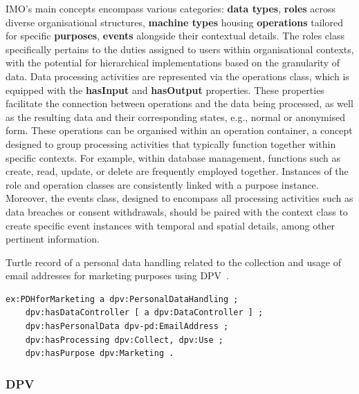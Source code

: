 IMO's main concepts encompass various categories: \textbf{data types}, \textbf{roles} across diverse organisational structures, \textbf{machine types} housing \textbf{operations} tailored for specific \textbf{purposes}, \textbf{events} alongside their contextual details.
The roles class specifically pertains to the duties assigned to users within organisational contexts, with the potential for hierarchical implementations based on the granularity of data.
Data processing activities are represented via the operations class, which is equipped with the \textbf{hasInput} and \textbf{hasOutput} properties.
These properties facilitate the connection between operations and the data being processed, as well as the resulting data and their corresponding states, e.g., normal or anonymised form.
These operations can be organised within an operation container, a concept designed to group processing activities that typically function together within specific contexts.
For example, within database management, functions such as create, read, update, or delete are frequently employed together.
Instances of the role and operation classes are consistently linked with a purpose instance.
Moreover, the events class, designed to encompass all processing activities such as data breaches or consent withdrawals, should be paired with the context class to create specific event instances with temporal and spatial details, among other pertinent information.

\begin{listing}
\caption{Turtle record of a personal data handling related to the collection and usage of email addresses for marketing purposes using DPV~\citep{panetto_creating_2019}.}
\label{list:ttl_dpv}
\begin{verbatim}
ex:PDHforMarketing a dpv:PersonalDataHandling ;
    dpv:hasDataController [ a dpv:DataController ] ;
    dpv:hasPersonalData dpv-pd:EmailAddress ;
    dpv:hasProcessing dpv:Collect, dpv:Use ;
    dpv:hasPurpose dpv:Marketing .
\end{verbatim}
\end{listing}

\subsubsection{DPV}
\label{sec:dpv}

